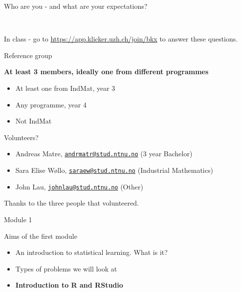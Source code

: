 \documentclass[10pt,ignorenonframetext,]{beamer}
\providecommand{\tightlist}{%
  \setlength{\itemsep}{0pt}\setlength{\parskip}{0pt}}
\begin{document}
\begin{frame}{Who are you - and what are your expectations?}

~

In class - go to \url{https://app.klicker.uzh.ch/join/bkx} to answer
these questions.

\end{frame}

\begin{frame}{Reference group}

\textbf{At least 3 members, ideally one from different programmes}

\begin{itemize}
\tightlist
\item
  At least one from IndMat, year 3
\item
  Any programme, year 4
\item
  Not IndMat
\end{itemize}

Volunteers?

\begin{itemize}
\tightlist
\item
  Andreas Matre,
  \href{mailto:andrmatr@stud.ntnu.no}{\nolinkurl{andrmatr@stud.ntnu.no}}
  (3 year Bachelor)
\item
  Sara Elise Wøllo,
  \href{mailto:saraew@stud.ntnu.no}{\nolinkurl{saraew@stud.ntnu.no}}
  (Industrial Mathematics)
\item
  John Lau,
  \href{mailto:johnlau@stud.ntnu.no}{\nolinkurl{johnlau@stud.ntnu.no}}
  (Other)
\end{itemize}

Thanks to the three people that volunteered.

\end{frame}

\begin{frame}{Module 1}

\begin{block}{Aims of the first module}

\begin{itemize}
\item
  An introduction to statistical learning. What is it?
\item
  Types of problems we will look at
\item
  \textbf{Introduction to R and RStudio } 
\end{itemize}

\end{block}

\end{frame}
\end{document}
